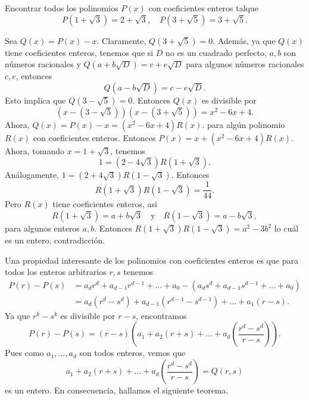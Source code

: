 \begin{example}
    Encontrar todos los polinomios $P(x)$ con coeficientes enteros talque
    \[
        P\left(1 + \sqrt {3}\right) = 2 + \sqrt {3}, \quad P\left(3 + \sqrt {5}\right) = 3 + \sqrt {5}.
    \]
\end{example}
\begin{solution}
    Sea $Q(x) = P(x) - x$.
    Claramente, $Q\left(3 +  \sqrt {5}\right) = 0$.
    Además, ya que $Q(x)$ tiene coeficientes enteros, tenemos que si $D$ no es un cuadrado perfecto,
    $a, b$ son números racionales y $Q\left(a + b\sqrt {D}\right) = c + e\sqrt {D}$ para algunos números racionales $c, e$, entonces
    \[
        Q\left(a - b \sqrt {D}\right) = c - e \sqrt {D}.
    \]
    Esto implica que $Q\left(3 - \sqrt {5}\right) = 0$.
    Entonces $Q(x)$ es divisible por
    \[
        \left(x - \left(3 - \sqrt {5}\right)\right) \left(x - \left(3 + \sqrt {5}\right)\right) = x^2 - 6x + 4.
    \]
    Ahora, $Q(x) = P(x) - x = (x^2 - 6x + 4) R(x).$
    para algún polinomio $R(x)$ con coeficientes enteros.
    Entonces $P(x) = x + (x^2 - 6x + 4) R(x).$
    Ahora, tomando $x = 1 + \sqrt {3}$, tenemos
    \[
        1 = \left(2 - 4\sqrt {3}\right) R\left(1 + \sqrt {3}\right).
    \]
    Análogamente, $1 = \left(2 + 4\sqrt {3}\right)  R\left(1 - \sqrt {3}\right)$.
    Entonces
    \[
        R\left(1 + \sqrt {3}\right)  R\left(1 - \sqrt {3}\right) = \frac{1}{44}.
    \]
    Pero $R(x)$ tiene coeficientes enteros, asi
    \[
        R\left(1 + \sqrt {3}\right) = a + b\sqrt {3} \quad \text{y} \quad R\left(1 - \sqrt {3}\right) = a - b\sqrt {3},
    \]
    para algunos enteros $a,b$.
    Entonces $R\left(1 + \sqrt {3}\right) R\left(1 - \sqrt {3}\right) = a^2 - 3b^2$ lo cuál es un entero, contradicción.
\end{solution}

Una propiedad interesante de los polinomios con coeficientes enteros es que para todos los enteros arbitrarios $r,s$ tenemos
\begin{align*}
    P(r) - P(s) &= a_d r^d + a_{d - 1} r^{d - 1} + \ldots + a_0 - \left(a_d s^d + a_{d - 1} s^{d - 1} + \ldots + a_0\right)\\
    & = a_d (r^d - s^d) + a_{d - 1} (r^{d - 1} - s^{d - 1}) + \ldots + a_1 (r - s).
\end{align*}
Ya que $r^k - s^k$ es divisible por $r - s$, encontramos
\[
    P(r) - P(s) = (r - s) \left(a_1 + a_2 (r + s) + \ldots + a_d \left(\frac{r^d - s^d}{r - s}\right)\right).
\]
Pues como $a_1, \ldots, a_d$ son todos enteros, vemos que
\[
    a_1 + a_2 (r + s) + \ldots + a_d \left(\frac{r^d - s^d}{r - s}\right) = Q(r, s)
\]
es un entero.
En consecuencia, hallamos el siguiente teorema.

